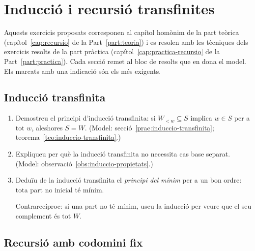 \chapter{Inducció i recursió transfinites}\label{cap:exercicis-recursio}

Aquests exercicis proposats corresponen al capítol homònim de la part teòrica (capítol~\ref{cap:recursio} de la Part~\ref{part:teoria}) i es resolen amb les tècniques dels exercicis resolts de la part pràctica (capítol~\ref{cap:practica-recursio} de la Part~\ref{part:practica}). Cada secció remet al bloc de resolts que en dona el model. Els marcats amb una indicació són els més exigents.

\section{Inducció transfinita}

\begin{enumerate}
  \item Demostreu el principi d'inducció transfinita: si \(W_{<w}\subseteq S\) implica \(w\in S\) per a tot \(w\), aleshores \(S=W\). (Model: secció~\ref{prac:induccio-transfinita}; teorema~\ref{teo:induccio-transfinita}.)

  \item Expliqueu per què la inducció transfinita no necessita cas base separat. (Model: observació~\ref{obs:induccio-propietats}.)

  \item Deduïu de la inducció transfinita el \emph{principi del mínim} per a un bon ordre: tota part no inicial té mínim. \begin{indicacio}Contrarecíproc: si una part no té mínim, useu la inducció per veure que el seu complement és tot \(W\).\end{indicacio}
\end{enumerate}

\section{Recursió amb codomini fix}

